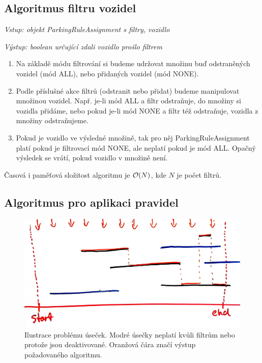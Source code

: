 \subsection{Algoritmus filtru vozidel}

\noindent
\textit{Vstup: objekt ParkingRuleAssignment s filtry, vozidlo}

\noindent
\textit{Výstup: boolean určující zdali vozidlo prošlo filtrem}

\begin{enumerate}
  \setlength\itemsep{.05em}
  \item Na základě módu filtrování si budeme udržovat množinu buď odstraněných vozidel (mód ALL), nebo přidaných vozidel (mód NONE).
  \item Podle příslušné akce filtrů (odstranit nebo přidat) budeme manipulovat množinou vozidel.
        Např. je-li mód ALL a filtr odstraňuje, do množiny si vozidla přidáme, nebo pokud je-li mód NONE a filtr též odstraňuje, vozidla z množiny odstraňujeme.
  \item Pokud je vozidlo ve výsledné množině, tak pro něj ParkingRuleAssignment platí pokud je filtrovací mód NONE,
        ale neplatí pokud je mód ALL. Opačný výsledek se vrátí, pokud vozidlo v množině není.
\end{enumerate}

\noindent
Časová i paměťová složitost algoritmu je ${\cal O}(N)$, kde $N$ je počet filtrů.

\subsection{Algoritmus pro aplikaci pravidel}

\begin{figure}[!htb] \centering
  \includegraphics[width=145mm]{../img/rules_drawing.jpg}
  \caption[Ilustrace problému úseček.]{Ilustrace problému úseček.
  Modré úsečky neplatí kvůli filtrům nebo protože jsou deaktivované. Oranžová čára značí výstup požadovaného algoritmu.}
  \label{fig:rules_drawing}
\end{figure}

